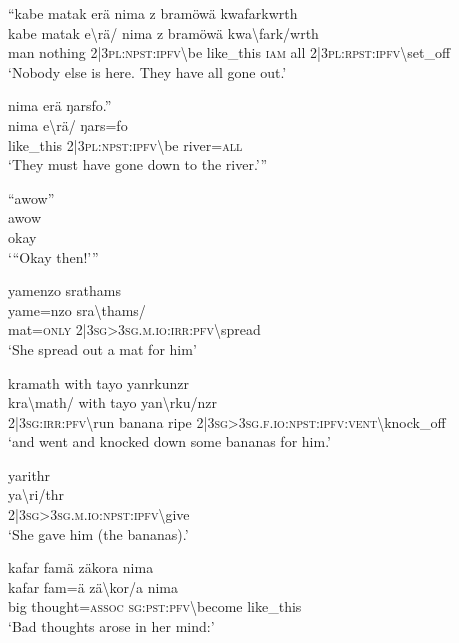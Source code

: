 \ea\label{ex:7:a4733}
``kabe matak erä nima z bramöwä kwafarkwrth\\
\gll kabe	matak	e{\textbackslash}rä/	nima	z	bramöwä	kwa{\textbackslash}fark/wrth\\
     man	nothing	2|3\textsc{pl}:\textsc{npst}:\textsc{ipfv}{\textbackslash}be	like\_this	\textsc{iam}	all	2|3\textsc{pl}:\textsc{rpst}:\textsc{ipfv}{\textbackslash}set\_off\\
\glt `Nobody else is here. They have all gone out.'
\z

\ea\label{ex:7:a4734}
nima erä ŋarsfo.''\\
\gll nima	e{\textbackslash}rä/	ŋars=fo\\
     like\_this	2|3\textsc{pl}:\textsc{npst}:\textsc{ipfv}{\textbackslash}be	river=\textsc{all}\\
\glt `They must have gone down to the river.'''
\z

\ea\label{ex:7:a4735}
``awow''\\
\gll awow\\
     okay\\
\glt `{``}Okay then!'''
\z

\ea\label{ex:7:a4736}
yamenzo srathams\\
\gll yame=nzo	sra{\textbackslash}thams/\\
     mat=\textsc{only}	2|3\textsc{sg}>3\textsc{sg}.\textsc{m}.\textsc{io}:\textsc{irr}:\textsc{pfv}{\textbackslash}spread\\
\glt `She spread out a mat for him'
\z

\ea\label{ex:7:a4737}
kramath with tayo yanrkunzr\\
\gll kra{\textbackslash}math/	with	tayo	yan{\textbackslash}rku/nzr\\
     2|3\textsc{sg}:\textsc{irr}:\textsc{pfv}{\textbackslash}run	banana	ripe	2|3\textsc{sg}>3\textsc{sg}.\textsc{f}.\textsc{io}:\textsc{npst}:\textsc{ipfv}:\textsc{vent}{\textbackslash}knock\_off\\
\glt `and went and knocked down some bananas for him.'
\z

\ea\label{ex:7:a4738}
yarithr\\
\gll ya{\textbackslash}ri/thr\\
     2|3\textsc{sg}>3\textsc{sg}.\textsc{m}.\textsc{io}:\textsc{npst}:\textsc{ipfv}{\textbackslash}give\\
\glt `She gave him (the bananas).'
\z

\ea\label{ex:7:a4739}
kafar famä zäkora nima\\
\gll kafar	fam=ä	zä{\textbackslash}kor/a	nima\\
     big	thought=\textsc{assoc}	\textsc{sg}:\textsc{pst}:\textsc{pfv}{\textbackslash}become	like\_this\\
\glt `Bad thoughts arose in her mind:'
\z

